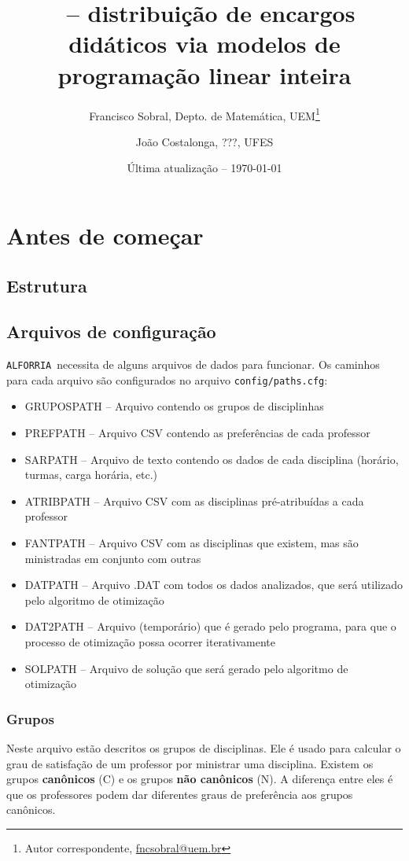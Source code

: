 \documentclass[a4paper, 12pt]{report}
\title{\alforria\ -- distribuição de encargos didáticos via
  modelos de programação linear inteira}
\author{Francisco Sobral, Depto. de Matemática, UEM\footnote{Autor
    correspondente, \url{fncsobral@uem.br}} \and João
  Costalonga, ???, UFES}
\date{Última atualização -- \today}
\newcommand{\alforria}{\texttt{ALFORRIA}}
\begin{document}
\maketitle

\chapter{Antes de começar}

\section{Estrutura}

\section{Arquivos de configuração}

\alforria\ necessita de alguns arquivos de dados para funcionar. Os
caminhos para cada arquivo são configurados no arquivo
\texttt{config/paths.cfg}:

\begin{itemize}
\item GRUPOSPATH -- Arquivo contendo os grupos de disciplinhas
\item PREFPATH -- Arquivo CSV contendo as preferências de cada professor
\item SARPATH -- Arquivo de texto contendo os dados de cada disciplina
  (horário, turmas, carga horária, etc.)
\item ATRIBPATH -- Arquivo CSV com as disciplinas pré-atribuídas a
  cada professor
\item FANTPATH -- Arquivo CSV com as disciplinas que existem, mas são
  ministradas em conjunto com outras
\item DATPATH -- Arquivo .DAT com todos os dados analizados, que será
  utilizado pelo algoritmo de otimização
\item DAT2PATH -- Arquivo (temporário) que é gerado pelo programa,
  para que o processo de otimização possa ocorrer iterativamente
\item SOLPATH -- Arquivo de solução que será gerado pelo algoritmo de
  otimização
\end{itemize}

\subsection{Grupos} \label{conf:grupos}

Neste arquivo estão descritos os grupos de disciplinas. Ele é usado
para calcular o grau de satisfação de um professor por ministrar uma
disciplina. Existem os grupos \textbf{canônicos} (C) e os grupos
\textbf{não canônicos} (N). A diferença entre eles é que os
professores podem dar diferentes graus de preferência aos grupos
canônicos.
\end{document}
